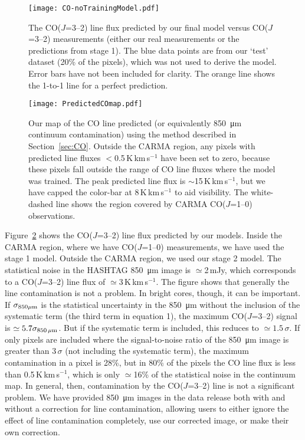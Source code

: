\documentclass[a4paper,fleqn,usenatbib, twocolumn]{aastex63}
\begin{document}
\begin{figure}
  \centering
  \texttt{[image: CO-noTrainingModel.pdf]}
  \caption{The CO($J$=3--2) line flux predicted by
  our final model versus CO($J$=3--2) measurements (either
  our real measurements or the predictions from stage 1). The blue data points are
  from our `test' dataset (20\%
  of the pixels), which was not used to derive the model. Error bars have not been included
  for clarity. The orange line shows the 1-to-1 line for a perfect prediction.
  }
  \label{fig:COmodel}
\end{figure}

\begin{figure}
  \centering
  \texttt{[image: PredictedCOmap.pdf]}
  \caption{Our map of the CO line predicted (or equivalently \SI{850}{\micro\meter} continuum contamination)
  using the method described in Section~\ref{sec:CO}. Outside
  the CARMA region, any pixels with predicted
  line fluxes $<$0.5\,K\,km\,s$^{-1}$ have been set to
  zero, because these pixels fall outside
  the range of CO line fluxes where the model
  was trained. The peak predicted line flux is $\sim$15\,K\,km\,s$^{-1}$, but we have capped
  the color-bar at 8\,K\,km\,s$^{-1}$ to aid visibility. The white-dashed line shows the region covered by
  CARMA CO($J$=1--0) observations.}
  \label{fig:COmap}
\end{figure}

Figure~\ref{fig:COmap} shows the CO($J$=3--2) line flux predicted by our models. Inside the CARMA region, 
where we have CO($J$=1--0) measurements, we have used the stage 1 model. Outside the CARMA region, we used our
stage 2 model. The statistical noise in the
HASHTAG \SI{850}{\micro\meter} image is $\simeq$2\,mJy, which
corresponds to a CO($J$=3--2) line flux of $\simeq3$\,K\,km\,s$^{-1}$. The figure shows that generally the
line contamination is not a problem. In bright cores,
though, it can be important. If $\sigma_{850\mu{\rm m}}$ is the
statistical uncertainty in the \SI{850}{\micro\meter} without
the inclusion of the systematic term (the third term
in equation 1), the maximum CO($J$=3--2) signal is $\simeq5.7\sigma_{850\,{\rm\mu m}}$. But if the systematic
term is included, this reduces to $\simeq 1.5\, \sigma$.
If only pixels
are included where the signal-to-noise ratio of the \SI{850}{\micro\meter} image is greater than 3\,$\sigma$ (not including the systematic term), the maximum
contamination in a pixel is 28\%, but in 80\% of the
pixels the CO line flux is less than
0.5\,K\,km\,s$^{-1}$, which is only $\simeq$16\% of the statistical noise in the continuum map. In general, then, contamination by the CO($J$=3--2) 
line is not a significant problem. We have provided
\SI{850}{\micro\meter} images in the data release both with and
without a correction for line contamination, allowing users to either ignore the effect of
line contamination completely, use our corrected image,
or make their own correction.
\end{document}
